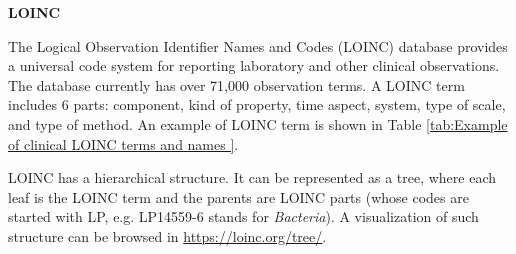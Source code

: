 \textbf{LOINC}

The Logical Observation Identifier Names and Codes (LOINC) database provides a universal code system for reporting laboratory and other clinical observations. The database currently has over 71,000 observation terms. A LOINC term includes 6 parts: component, kind of property, time aspect, system, type of scale, and type of method. An example of LOINC term is shown in Table \ref{tab:Example of clinical LOINC terms and names }.

LOINC has a hierarchical structure. It can be represented as a tree, where each leaf is the LOINC term and the parents are LOINC parts (whose codes are started with LP, e.g. LP14559-6 stands for \textit{Bacteria}). A visualization of such structure can be browsed in \url{https://loinc.org/tree/}. 









